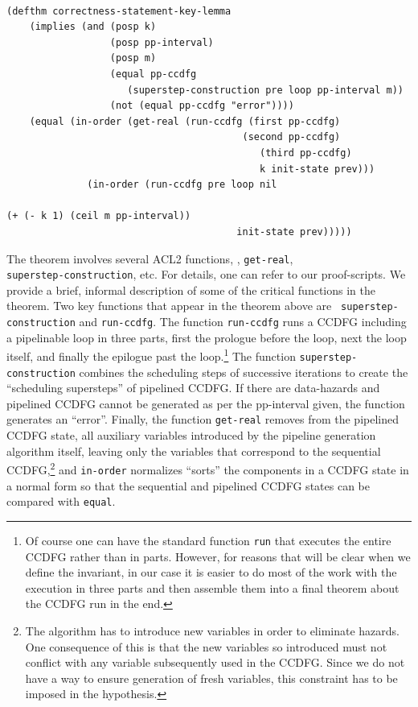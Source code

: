 \small
\begin{verbatim}
    
(defthm correctness-statement-key-lemma
    (implies (and (posp k)
                  (posp pp-interval)
                  (posp m)
                  (equal pp-ccdfg 
                     (superstep-construction pre loop pp-interval m))
                  (not (equal pp-ccdfg "error"))))
    (equal (in-order (get-real (run-ccdfg (first pp-ccdfg) 
                                         (second pp-ccdfg) 
                            	            (third pp-ccdfg) 
                            	            k init-state prev)))
              (in-order (run-ccdfg pre loop nil 
								               		                  (+ (- k 1) (ceil m pp-interval)) 
                                 		init-state prev)))))
\end{verbatim}
\normalsize

The theorem involves several ACL2 functions, \eg,
{\tt get-real}, \\ {\tt superstep-construction}, etc. 
For details, one can
  refer to our proof-scripts. 
We provide a brief, informal
description of some of the critical functions in the theorem.
Two key functions that appear in the theorem above are {\tt
  superstep-construction} and {\tt run-ccdfg}. The function {\tt run-ccdfg} runs a CCDFG including a
pipelinable loop in three parts, first the prologue before the
loop, next the loop itself, and finally the epilogue past the
loop.\footnote{Of course one can have the standard function
  {\tt run} that executes the entire CCDFG rather than in
  parts.  However, for reasons that will be clear when we
  define the invariant, in our case it is easier to do most
  of the work with the execution in three parts and then
  assemble them into a final theorem about the CCDFG run in
  the end.}  The function {\tt superstep-construction} combines the
scheduling steps of successive iterations to create the
``scheduling supersteps'' of pipelined CCDFG.  If there are
data-hazards and pipelined CCDFG cannot be generated as per
the pp-interval given, the function generates an ``error''.
Finally, the function {\tt get-real} removes from the
pipelined CCDFG state, all auxiliary variables introduced by
the pipeline generation algorithm itself, leaving only the
variables that correspond to the sequential
CCDFG,\footnote{The algorithm has to introduce new variables
  in order to eliminate hazards.  One consequence of this is
  that the new variables so introduced must not conflict
  with any variable subsequently used in the CCDFG.  Since
  we do not have a way to ensure generation of fresh
  variables, this constraint has to be imposed in the
  hypothesis.}  and {\tt in-order} normalizes ``sorts'' the
components in a CCDFG state in a normal form so that the
sequential and pipelined CCDFG states can be compared with
{\tt equal}.

